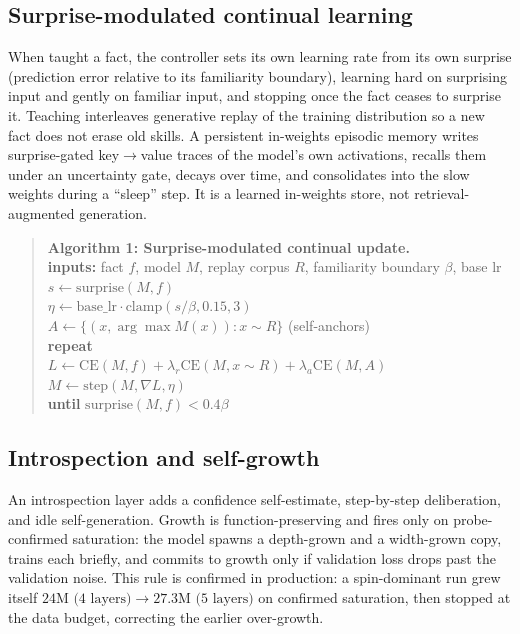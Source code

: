 \documentclass[journal]{IEEEtran}
\begin{document}
\subsection{Surprise-modulated continual learning}
When taught a fact, the controller sets its own learning rate from its own surprise (prediction error relative to its familiarity boundary), learning hard on surprising input and gently on familiar input, and stopping once the fact ceases to surprise it. Teaching interleaves generative replay of the training distribution so a new fact does not erase old skills. A persistent in-weights episodic memory writes surprise-gated key$\to$value traces of the model's own activations, recalls them under an uncertainty gate, decays over time, and consolidates into the slow weights during a ``sleep'' step. It is a learned in-weights store, not retrieval-augmented generation.

\begin{quote}\small\noindent\textbf{Algorithm 1: Surprise-modulated continual update.}\\
\textbf{inputs:} fact $f$, model $M$, replay corpus $R$, familiarity boundary $\beta$, base lr\\
$s \leftarrow \mathrm{surprise}(M, f)$\\
$\eta \leftarrow \text{base\_lr} \cdot \mathrm{clamp}(s/\beta, 0.15, 3)$\\
$A \leftarrow \{ (x, \arg\max M(x)) : x \sim R \}$ \; (self-anchors)\\
\textbf{repeat}\\
\hspace*{1em}$L \leftarrow \mathrm{CE}(M, f) + \lambda_r \mathrm{CE}(M, x{\sim}R) + \lambda_a \mathrm{CE}(M, A)$\\
\hspace*{1em}$M \leftarrow \mathrm{step}(M, \nabla L, \eta)$\\
\textbf{until} $\mathrm{surprise}(M, f) < 0.4\beta$
\end{quote}

\subsection{Introspection and self-growth}
An introspection layer adds a confidence self-estimate, step-by-step deliberation, and idle self-generation. Growth is function-preserving and fires only on probe-confirmed saturation: the model spawns a depth-grown and a width-grown copy, trains each briefly, and commits to growth only if validation loss drops past the validation noise. This rule is confirmed in production: a spin-dominant run grew itself $24\text{M (4 layers)} \to 27.3\text{M (5 layers)}$ on confirmed saturation, then stopped at the data budget, correcting the earlier over-growth.
\end{document}

